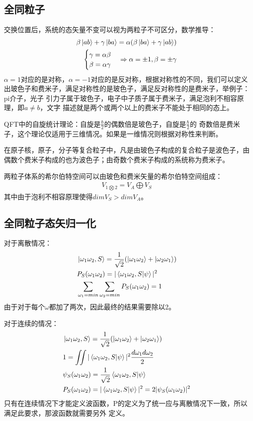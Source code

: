 \documentclass[UTF8]{article}
\numberwithin{equation}{section}
\begin{document}
\subsection{全同粒子}
交换位置后，系统的态矢量不变可以视为两粒子不可区分，数学推导：
\begin{align*}
    \beta \ket{ab}+\gamma\ket{ba}=\alpha(\beta \ket{ba}+\gamma\ket{ab}) \\
    \begin{cases}
        \gamma = \alpha\beta \\
        \beta = \alpha\gamma
    \end{cases}\Rightarrow \alpha = \pm 1,\beta = \pm \gamma
\end{align*}
$\alpha =1$对应的是对称，$\alpha = -1$对应的是反对称，根据对称性的不同，我们可以定义
出玻色子和费米子，满足对称性的是玻色子，满足反对称性的是费米子，举例子：pi介子，光子
引力子属于玻色子，电子中子质子属于费米子，满足泡利不相容原理，即$a\neq b$，文字
描述就是两个或两个以上的费米子不能处于相同的态上。

QFT中的自旋统计理论：自旋是$\frac{\hbar}{2}$的偶数倍是玻色子，自旋是$\frac{\hbar}{2}$的
奇数倍是费米子，这个理论仅适用于三维情况。如果是一维情况则根据对称性来判断。

在原子核，原子，分子等复合粒子中，凡是由玻色子构成的复合粒子是波色子，由偶数个费米子构成的也为波色子；由奇数个费米子构成的系统称为费米子。

两粒子体系的希尔伯特空间可以由玻色和费米矢量的希尔伯特空间组成：
\begin{align*}
    V_{1\bigotimes 2}=V_A\bigoplus V_S
\end{align*}
其中由于泡利不相容原理使得$dim V_S>dim V_A$。
\subsection{全同粒子态矢归一化}
对于离散情况：
\begin{align*}
     & \ket{\omega_1\omega_2,S}=\frac{1}{\sqrt{2}}(\ket{\omega_1\omega_2}+\ket{\omega_2\omega_1}) \\
     & P_S(\omega_1\omega_2)=|\braket{\omega_1\omega_2,S}{\psi}|^2                                \\
     & \sum_{\omega_1=min}\sum_{\omega_2=min}P_S(\omega_1\omega_2)=1
\end{align*}
由于对于每个$\omega$都加了两次，因此最终的结果需要除以2。

对于连续的情况：
\begin{align*}
     & \ket{\omega_1\omega_2,S}=\frac{1}{\sqrt{2}}(\ket{\omega_1\omega_2}+\ket{\omega_2\omega_1}) \\
     & 1=\iint |\braket{\omega_1\omega_2,S}{\psi}|^2 \frac{d\omega_1d\omega_2}{2}                 \\
     & \psi_S(\omega_1\omega_2)=\frac{1}{\sqrt{2}}\braket{\omega_1\omega_2,S}{\psi}               \\
     & P_S(\omega_1\omega_2)=|\braket{\omega_1\omega_2,S}{\psi}|^2=2|\psi_S(\omega_1\omega_2)|^2
\end{align*}
只有在连续情况下才能定义波函数，P的定义为了统一应与离散情况下一致，所以满足此要求，那波函数就需要另外
定义。
\end{document}
